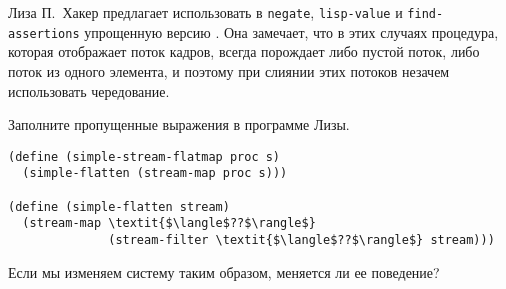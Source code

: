 \begin{exercise}{4.74}%
\label{EX4.74}%
Лиза П.~Хакер предлагает использовать в
{\tt negate}, {\tt lisp-value} и
{\tt find-assertions} упрощенную версию
. Она 
замечает, что в этих случаях
процедура, которая отображает поток кадров, всегда порождает либо
пустой поток, либо поток из одного элемента, и поэтому при слиянии
этих потоков незачем использовать чередование.

\begin{plainenum}
\item
Заполните пропущенные выражения в программе Лизы.

\begin{Verbatim}[fontsize=\small]
(define (simple-stream-flatmap proc s)
  (simple-flatten (stream-map proc s)))

(define (simple-flatten stream)
  (stream-map \textit{$\langle$??$\rangle$}
              (stream-filter \textit{$\langle$??$\rangle$} stream)))
\end{Verbatim}

\item
Если мы изменяем систему таким образом, меняется ли
ее поведение?
\end{plainenum}
\end{exercise}

